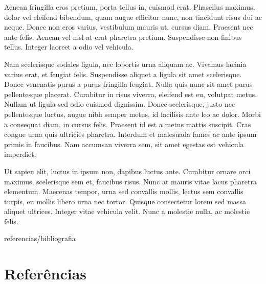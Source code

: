 \documentclass[book,A4paper,10pt,twoside,oldfontcommands]{memoir}\usepackage[]{graphicx}\usepackage[usenames,dvipsnames]{color}
\begin{document}
\begin{btUnit}
Aenean fringilla eros pretium, porta tellus in, euismod erat.
Phasellus maximus, dolor vel eleifend bibendum, quam augue efficitur
nunc, non tincidunt risus dui ac neque. Donec non eros varius,
vestibulum mauris ut, cursus diam. Praesent nec ante felis. Aenean vel
nisl at erat pharetra pretium. Suspendisse non finibus tellus. Integer
laoreet a odio vel vehicula.

Nam scelerisque sodales ligula, nec lobortis urna aliquam ac. Vivamus
lacinia varius erat, et feugiat felis. Suspendisse aliquet a ligula
sit amet scelerisque. Donec venenatis purus a purus fringilla feugiat.
Nulla quis nunc sit amet purus pellentesque placerat. Curabitur in
risus viverra, eleifend est eu, volutpat metus. Nullam ut ligula sed
odio euismod dignissim. Donec scelerisque, justo nec pellentesque
luctus, augue nibh semper metus, id facilisis ante leo ac dolor. Morbi
a consequat diam, in cursus felis. Praesent id est a metus mattis
suscipit. Cras congue urna quis ultricies pharetra. Interdum et
malesuada fames ac ante ipsum primis in faucibus. Nam accumsan viverra
sem, sit amet egestas est vehicula imperdiet.

Ut sapien elit, luctus in ipsum non, dapibus luctus ante. Curabitur
ornare orci maximus, scelerisque sem et, faucibus risus. Nunc at
mauris vitae lacus pharetra elementum. Maecenas tempor, urna sed
convallis mollis, lectus sem convallis turpis, eu mollis libero urna
nec tortor. Quisque consectetur lorem sed massa aliquet ultrices.
Integer vitae vehicula velit. Nunc a molestie nulla, ac molestie
felis.

\begin{btSect}{referencias/bibliografia}
\section*{Referências}
\btPrintCited
\end{btSect}

\end{btUnit}
\end{document}
